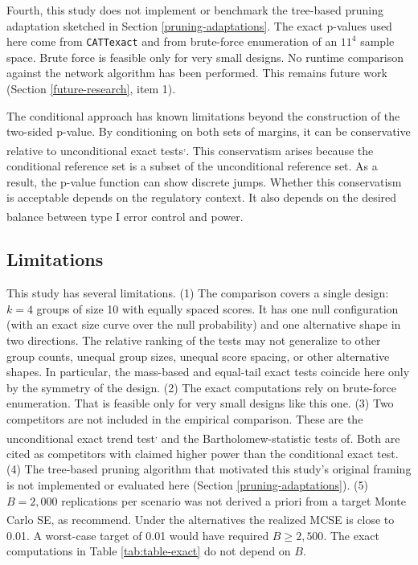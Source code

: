 \documentclass[
  11pt,
]{article}
\begin{document}
Fourth, this study does not implement or benchmark the
tree-based pruning adaptation sketched in Section
\ref{pruning-adaptations}. The exact p-values used here
come from \texttt{CATTexact} and from brute-force enumeration of
an \(11^4\) sample space. Brute force is feasible only for
very small designs. No runtime comparison against the
network algorithm has been performed. This remains future
work (Section \ref{future-research}, item 1).

The conditional approach has known limitations beyond
the construction of the two-sided p-value. By conditioning
on both sets of margins, it can be conservative relative
to unconditional exact tests\textsuperscript{,}. This
conservatism arises because the conditional reference
set is a subset of the unconditional reference set. As a
result, the p-value function can show discrete jumps.
Whether this conservatism is acceptable depends on the
regulatory context. It also depends on the desired
balance between type I error control and power\textsuperscript{}.

\subsection{Limitations}\label{limitations}

This study has several limitations. (1) The comparison
covers a single design: \(k = 4\) groups of size 10 with
equally spaced scores. It has one null configuration
(with an exact size curve over the null probability) and
one alternative shape in two directions. The relative
ranking of the tests may not generalize to other group
counts, unequal group sizes, unequal score spacing, or
other alternative shapes. In particular, the mass-based
and equal-tail exact tests coincide here only by the
symmetry of the design. (2) The exact computations rely
on brute-force enumeration. That is feasible only for
very small designs like this one. (3) Two competitors are
not included in the empirical comparison. These are the
unconditional exact trend test\textsuperscript{,} and the
Bartholomew-statistic tests of\textsuperscript{}. Both are cited as competitors
with claimed higher power than the conditional exact
test. (4) The tree-based pruning algorithm that motivated
this study's original framing is not implemented or
evaluated here (Section \ref{pruning-adaptations}).
(5) \(B = 2{,}000\) replications per scenario was not
derived a priori from a target Monte Carlo SE, as\textsuperscript{} recommend. Under the alternatives the
realized MCSE is close to 0.01. A worst-case target of
0.01 would have required \(B \geq 2{,}500\). The exact
computations in Table \ref{tab:table-exact} do not
depend on \(B\).
\end{document}
